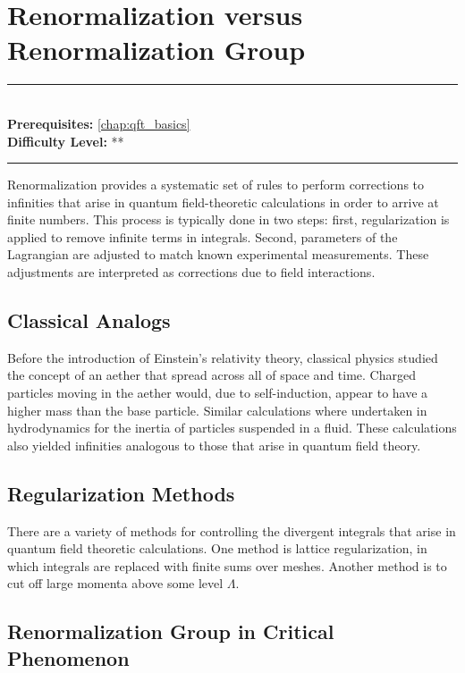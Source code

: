 \documentclass[book.tex]{subfiles}
\begin{document}
\chapter{Renormalization versus Renormalization Group}

\label{chap:renormalization_group}
\noindent\rule{11cm}{0.4pt} \\
\textbf{Prerequisites:} \autoref{chap:qft_basics}  \\
\textbf{Difficulty Level:} ** \\
\noindent\rule{11cm}{0.4pt}
\vspace{5mm}


Renormalization provides a systematic set of rules to perform corrections to infinities that arise in quantum field-theoretic calculations in order to arrive at finite numbers. This process is typically done in two steps: first, regularization is applied to remove infinite terms in integrals. Second, parameters of the Lagrangian are adjusted to match known experimental measurements. These adjustments are interpreted as corrections due to field interactions.

\section{Classical Analogs}

Before the introduction of Einstein's relativity theory, classical physics studied the concept of an aether that spread across all of space and time. Charged particles moving in the aether would, due to self-induction, appear to have a higher mass than the base particle. Similar calculations where undertaken in hydrodynamics for the inertia of particles suspended in a fluid. These calculations also yielded infinities analogous to those that arise in quantum field theory. 

\section{Regularization Methods}

There are a variety of methods for controlling the divergent integrals that arise in quantum field theoretic calculations. One method is lattice regularization, in which integrals are replaced with finite sums over meshes. Another method is to cut off large momenta above some level $\Lambda$.

\section{Renormalization Group in Critical Phenomenon}
\end{document}
